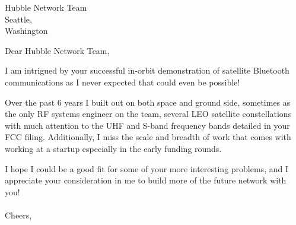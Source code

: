 \documentclass[
	parskip=half, %
	enlargefirstpage=true, %
]{scrlttr2} %
\begin{document}

\begin{letter}{
	Hubble Network Team\\
        Seattle,\\
        Washington\\
}

\opening{Dear Hubble Network Team,}
I am intrigued by your successful in-orbit demonstration of satellite Bluetooth communications as I never expected that could even be possible!

Over the past 6 years I built out on both space and ground side, sometimes as the only RF systems engineer on the team, several LEO satellite constellations with much attention to the UHF and S-band frequency bands detailed in your FCC filing.  Additionally, I miss the scale and breadth of work that comes with working at a startup especially in the early funding rounds. 

I hope I could be a good fit for some of your more interesting problems, and I appreciate your consideration in me to build more of the future network with you!\\
\\
Cheers,\\


\end{letter}
\end{document}
